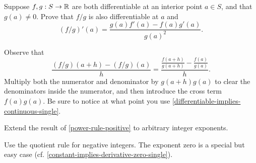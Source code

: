 \begin{exercise} \label{quotient-rule-single} 
	Suppose $f, g : S \to \mathbb{R}$ are both differentiable at an interior point $a \in S$, and that $g(a) \neq 0$. Prove that $f/g$ is also differentiable at $a$ and 
	\[ (f/g)'(a) = \frac{g(a)f'(a) - f(a)g'(a)}{g(a)^2}. \] 
	\begin{hint} Observe that \[ \frac{(f/g)(a+h)-(f/g)(a)}{h} = \frac{\frac{f(a+h)}{g(a+h)} - \frac{f(a)}{g(a)} }{h}. \]
	Multiply both the numerator and denominator by $g(a+h)g(a)$ to clear the denominators inside the numerator, and then introduce the cross term $f(a)g(a)$. Be sure to notice at what point you use \cref{differentiable-implies-continuous-single}.
	\end{hint}
\end{exercise}

\begin{exercise} \label{power-rule-integer} 
	Extend the result of \cref{power-rule-positive} to arbitrary integer exponents. 
	\begin{hint} Use the quotient rule for negative integers. The exponent zero is a special but easy case (cf. \cref{constant-implies-derivative-zero-single}).  
	\end{hint}
\end{exercise}


